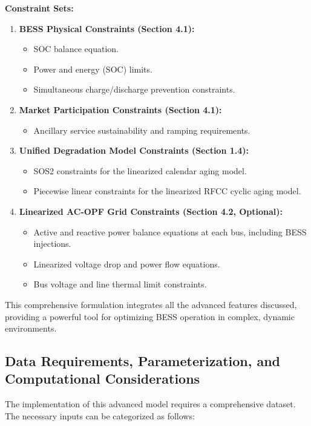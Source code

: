 \textbf{Constraint Sets:}
\begin{enumerate}
    \item \textbf{BESS Physical Constraints (Section 4.1):}
    \begin{itemize}
        \item SOC balance equation.
        \item Power and energy (SOC) limits.
        \item Simultaneous charge/discharge prevention constraints.
    \end{itemize}
    \item \textbf{Market Participation Constraints (Section 4.1):}
    \begin{itemize}
        \item Ancillary service sustainability and ramping requirements.
    \end{itemize}
    \item \textbf{Unified Degradation Model Constraints (Section 1.4):}
    \begin{itemize}
        \item SOS2 constraints for the linearized calendar aging model.
        \item Piecewise linear constraints for the linearized RFCC cyclic aging model.
    \end{itemize}
    \item \textbf{Linearized AC-OPF Grid Constraints (Section 4.2, Optional):}
    \begin{itemize}
        \item Active and reactive power balance equations at each bus, including BESS injections.
        \item Linearized voltage drop and power flow equations.
        \item Bus voltage and line thermal limit constraints.
    \end{itemize}
\end{enumerate}

This comprehensive formulation integrates all the advanced features discussed, providing a powerful tool for optimizing BESS operation in complex, dynamic environments.

\subsection{Data Requirements, Parameterization, and Computational Considerations}

The implementation of this advanced model requires a comprehensive dataset. The necessary inputs can be categorized as follows:


